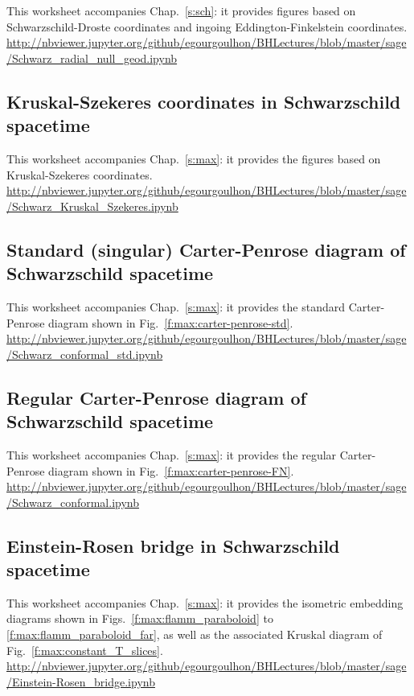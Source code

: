 This worksheet accompanies Chap.~\ref{s:sch}: it provides figures based on
Schwarzschild-Droste coordinates and ingoing Eddington-Finkelstein coordinates.\\[1ex]
{\footnotesize
\url{http://nbviewer.jupyter.org/github/egourgoulhon/BHLectures/blob/master/sage/Schwarz_radial_null_geod.ipynb}
}

\subsection{Kruskal-Szekeres coordinates in Schwarzschild spacetime}

This worksheet accompanies Chap.~\ref{s:max}: it provides the figures based on
Kruskal-Szekeres coordinates.\\[1ex]
{\footnotesize
\url{http://nbviewer.jupyter.org/github/egourgoulhon/BHLectures/blob/master/sage/Schwarz_Kruskal_Szekeres.ipynb}
}

\subsection{Standard (singular) Carter-Penrose diagram of Schwarzschild spacetime}
\label{s:sam:std_Carter-Penrose}
This worksheet accompanies Chap.~\ref{s:max}: it provides the standard
Carter-Penrose diagram shown in Fig.~\ref{f:max:carter-penrose-std}.\\[1ex]
{\footnotesize
\url{http://nbviewer.jupyter.org/github/egourgoulhon/BHLectures/blob/master/sage/Schwarz_conformal_std.ipynb}
}

\subsection{Regular Carter-Penrose diagram of Schwarzschild spacetime}
\label{s:sam:reg_Carter-Penrose}
This worksheet accompanies Chap.~\ref{s:max}: it provides the regular
Carter-Penrose diagram shown in Fig.~\ref{f:max:carter-penrose-FN}.\\[1ex]
{\footnotesize
\url{http://nbviewer.jupyter.org/github/egourgoulhon/BHLectures/blob/master/sage/Schwarz_conformal.ipynb}
}

\subsection{Einstein-Rosen bridge in Schwarzschild spacetime}
\label{s:sam:Einstein-Rosen}
This worksheet accompanies Chap.~\ref{s:max}: it provides the
isometric embedding diagrams shown in Figs.~\ref{f:max:flamm_paraboloid}
to \ref{f:max:flamm_paraboloid_far}, as well as the associated
Kruskal diagram of Fig.~\ref{f:max:constant_T_slices}.\\[1ex]
{\footnotesize
\url{http://nbviewer.jupyter.org/github/egourgoulhon/BHLectures/blob/master/sage/Einstein-Rosen_bridge.ipynb}
}


